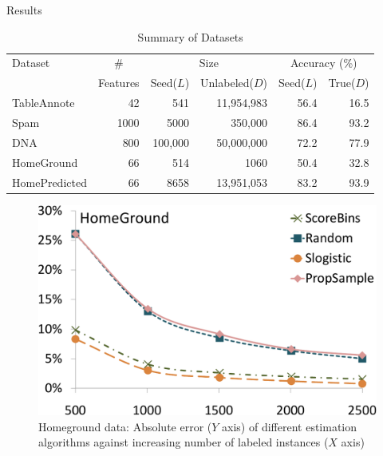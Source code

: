 \documentclass[11pt]{beamer}
\begin{document}
\begin{frame}[allowframebreaks]{Results}
\begin{center}
\begin{table}
\centering
\begin{small}
\begin{tabular}{|l@{}|@{}r|@{}r|@{}r|@{}r|@{}r|}
\hline
Dataset & \multicolumn{1}{c}{\#} \vline & \multicolumn{2}{c}{Size} \vline & \multicolumn{2}{c}{Accuracy (\%)} \vline \\
 & \multicolumn{1}{c}{Features} \vline & \multicolumn{1}{c}{Seed($L$)} \vline & \multicolumn{1}{c}{Unlabeled($D$)} \vline & \multicolumn{1}{r}{Seed($L$)} \vline & \multicolumn{1}{r}{True($D$)} \vline \\
\hline
TableAnnote & 42 & 541 & 11,954,983 & 56.4 & 16.5 \\
Spam & 1000 & 5000 & 350,000 & 86.4 & 93.2 \\
DNA & 800 & 100,000 & 50,000,000 & 72.2 & 77.9 \\
HomeGround & 66 & 514 & 1060 & 50.4 & 32.8 \\
HomePredicted & 66 & 8658 & 13,951,053 & 83.2 & 93.9 \\
\hline
\end{tabular}
\end{small}
\caption{Summary of Datasets}
\end{table}
\end{center}

\framebreak

\begin{center}
\begin{figure}
\includegraphics[width=0.82\hsize]{figs/e1homeground_crop}
\caption{Homeground data: Absolute error ($Y$ axis) of different estimation algorithms against increasing number of labeled instances ($X$ axis)}
\end{figure}


\end{center}
\end{frame}
\end{document}
